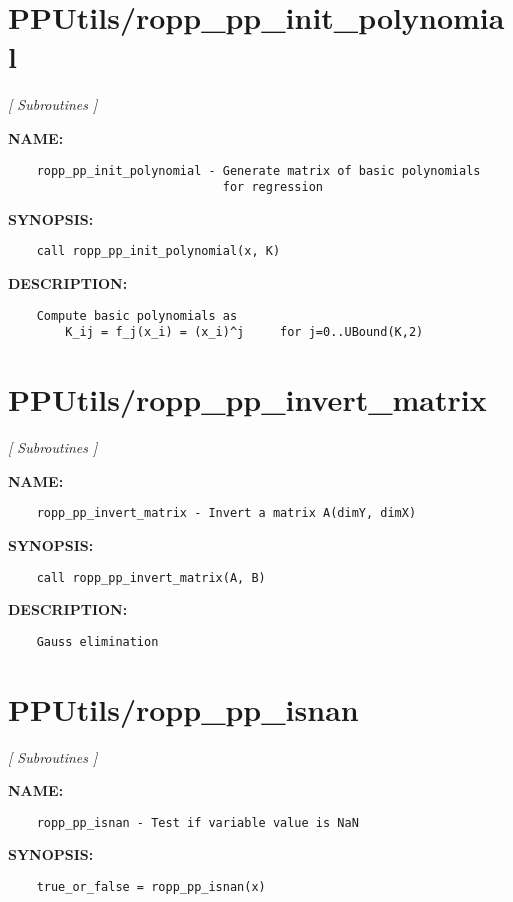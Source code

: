 \section{PPUtils/ropp\_pp\_init\_polynomial}
\textsl{[ Subroutines ]}

\label{ch:robo58}
\label{ch:PPUtils_ropp_pp_init_polynomial}
\textbf{NAME:}\hspace{0.08in}\begin{Verbatim}
    ropp_pp_init_polynomial - Generate matrix of basic polynomials 
                              for regression
\end{Verbatim}
\textbf{SYNOPSIS:}\hspace{0.08in}\begin{Verbatim}
    call ropp_pp_init_polynomial(x, K)
\end{Verbatim}
\textbf{DESCRIPTION:}\hspace{0.08in}\begin{Verbatim}
    Compute basic polynomials as
        K_ij = f_j(x_i) = (x_i)^j     for j=0..UBound(K,2)
\end{Verbatim}
\section{PPUtils/ropp\_pp\_invert\_matrix}
\textsl{[ Subroutines ]}

\label{ch:robo59}
\label{ch:PPUtils_ropp_pp_invert_matrix}
\textbf{NAME:}\hspace{0.08in}\begin{Verbatim}
    ropp_pp_invert_matrix - Invert a matrix A(dimY, dimX) 
\end{Verbatim}
\textbf{SYNOPSIS:}\hspace{0.08in}\begin{Verbatim}
    call ropp_pp_invert_matrix(A, B)
\end{Verbatim}
\textbf{DESCRIPTION:}\hspace{0.08in}\begin{Verbatim}
    Gauss elimination
\end{Verbatim}
\section{PPUtils/ropp\_pp\_isnan}
\textsl{[ Subroutines ]}

\label{ch:robo60}
\label{ch:PPUtils_ropp_pp_isnan}
\textbf{NAME:}\hspace{0.08in}\begin{Verbatim}
    ropp_pp_isnan - Test if variable value is NaN
\end{Verbatim}
\textbf{SYNOPSIS:}\hspace{0.08in}\begin{Verbatim}
    true_or_false = ropp_pp_isnan(x)
\end{Verbatim}

